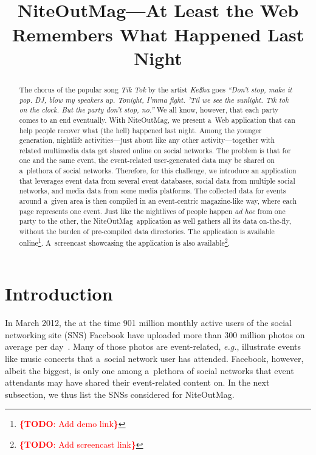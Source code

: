 \documentclass{acm_proc_article-sp}
\let\oldemph\emph
\renewcommand{\emph}[1]{\oldemph{\fontsize{9}{9}\selectfont #1}}
\newcommand{\todo}[1]{\noindent\textcolor{red}{{\bf \{TODO}: #1{\bf \}}}}
\begin{document}
\title{NiteOutMag{\Large \textbf{\textsuperscript{\texttrademark}}}---At Least the Web\\ Remembers What Happened Last Night}

\author{
}
\maketitle

\begin{abstract}
The chorus of the popular song \emph{Tik Tok} by the artist \emph{Ke\$ha} goes
\emph{``Don't stop, make it pop. DJ, blow my speakers up. Tonight, I'mma fight.
'Til we see the sunlight. Tik tok on the clock. But the party don't stop, no.''}
We all know, however, that each party comes to an end eventually.
With NiteOutMag\texttrademark, we present a~Web application
that can help people recover what (the hell) happened last night.
Among the younger generation, nightlife activities---just about like any other
activity---together with related multimedia data get shared online on social networks.
The problem is that for one and the same event, the event-related user-generated data
may be shared on a~plethora of social networks.
Therefore, for this challenge, we introduce an application
that leverages event data from several event databases,
social data from multiple social networks, and media data from some media platforms.
The collected data for events around a~given area is then compiled
in an event-centric magazine-like way, where each page represents one event.
Just like the nightlives of people happen \emph{ad hoc} from one party to the other,
the NiteOutMag\texttrademark~application as well
gathers all its data on-the-fly, without the burden of pre-compiled data directories.
The application is available online\footnote{\todo{Add demo link}}.
A~screencast showcasing the application is also available\footnote{\todo{Add screencast link}}.
\end{abstract}




\section{Introduction}
In March 2012, the at the time 901 million monthly active users
of the social networking site (SNS) Facebook
have uploaded more than 300 million photos on average per day~\cite{Facebook2012}.
Many of those photos are event-related, \emph{e.g.},
illustrate events like music concerts that a~social network user has attended.
Facebook, however, albeit the biggest, is only one among a~plethora of social networks
that event attendants may have shared their event-related content on.
In the next subsection, we thus list the SNSs considered for
NiteOutMag\texttrademark.
\end{document}

